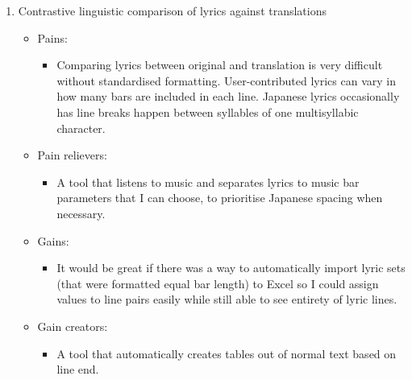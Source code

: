 \documentclass[12pt]{article}
\begin{document}
\begin{enumerate}
    \item Contrastive linguistic comparison of lyrics against translations
    \begin{itemize}
        \renewcommand{\labelitemi}{$\clock$}
        \renewcommand{\labelitemii}{$\cdot$}
        \item Pains:
        \begin{itemize}
            \item Comparing lyrics between original and translation is very difficult without standardised formatting. User-contributed lyrics can vary in how many bars are included in each line. Japanese lyrics occasionally has line breaks happen between syllables of one multisyllabic character.
        \end{itemize}
        \renewcommand{\labelitemi}{$\sun$}
        \item Pain relievers:
        \begin{itemize}
            \item A tool that listens to music and separates lyrics to music bar parameters that I can choose, to prioritise Japanese spacing when necessary.
        \end{itemize}
        \renewcommand{\labelitemi}{$\smiley$}    
        \item Gains:
        \begin{itemize}
            \item It would be great if there was a way to automatically import lyric sets (that were formatted equal bar length) to Excel so I could assign values to line pairs easily while still able to see entirety of lyric lines.
        \end{itemize}
        \renewcommand{\labelitemi}{$\blacksmiley$}
        \item Gain creators:
        \begin{itemize}
            \item A tool that automatically creates tables out of normal text based on line end.
        \end{itemize}
    \end{itemize}
    

\end{enumerate}
\end{document}
